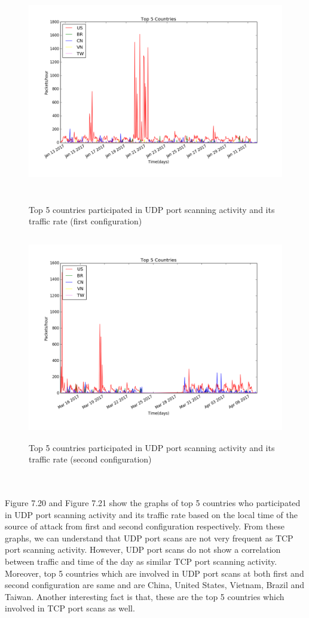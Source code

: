 \begin{figure}[p]
\centering
\includegraphics[width=15cm, height=9cm]{images/top5countries_udp_first.png}
\caption{Top 5 countries participated in UDP port scanning activity and its traffic rate (first configuration)}
\centering
\includegraphics[width=15cm, height=9cm]{images/top5countries_udp_honeypot.png}
\caption{Top 5 countries participated in UDP port scanning activity and its traffic rate (second configuration)}
\end{figure}
\\\\
Figure 7.20 and Figure 7.21 show the graphs of top 5 countries who participated in UDP port scanning activity and its traffic rate based on the local time of the source of attack from first and second configuration respectively.
From these graphs, we can understand that UDP port scans are not very frequent as TCP port scanning activity.
However, UDP port scans do not show a correlation between traffic and time of the day as similar TCP port scanning activity.
Moreover, top 5 countries which are involved in UDP port scans at both first and second configuration are same and are China, United States, Vietnam, Brazil and Taiwan.
Another interesting fact is that, these are the top 5 countries which involved in TCP port scans as well.
